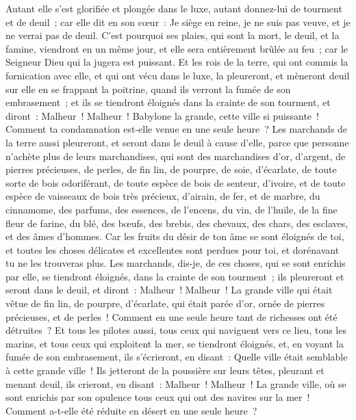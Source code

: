 \begin{multicols}{2}
Autant elle s'est glorifiée et plongée dans le luxe, autant donnez-lui de tourment et de deuil~; car elle dit en son cœur~: Je siège en reine, je ne suis pas veuve, et je ne verrai pas de deuil.
C'est pourquoi ses plaies, qui sont la mort, le deuil, et la famine, viendront en un même jour, et elle sera entièrement brûlée au feu~; car le Seigneur Dieu qui la jugera est puissant.
Et les rois de la terre, qui ont commis la fornication avec elle, et qui ont vécu dans le luxe, la pleureront, et mèneront deuil sur elle en se frappant la poitrine, quand ils verront la fumée de son embrasement~;
et ils se tiendront éloignés dans la crainte de son tourment, et diront~: Malheur~! Malheur~! Babylone la grande, cette ville si puissante~! Comment ta condamnation est-elle venue en une seule heure~?
Les marchands de la terre aussi pleureront, et seront dans le deuil à cause d'elle, parce que personne n'achète plus de leurs marchandises,
qui sont des marchandises d'or, d'argent, de pierres précieuses, de perles, de fin lin, de pourpre, de soie, d'écarlate, de toute sorte de bois odoriférant, de toute espèce de bois de senteur, d'ivoire, et de toute espèce de vaisseaux de bois très précieux, d'airain, de fer, et de marbre,
du cinnamome, des parfums, des essences, de l'encens, du vin, de l'huile, de la fine fleur de farine, du blé, des bœufs, des brebis, des chevaux, des chars, des esclaves, et des âmes d'hommes.
Car les fruits du désir de ton âme se sont éloignés de toi, et toutes les choses délicates et excellentes sont perdues pour toi, et dorénavant tu ne les trouveras plus.
Les marchands, dis-je, de ces choses, qui se sont enrichis par elle, se tiendront éloignés, dans la crainte de son tourment~; ils pleureront et seront dans le deuil,
et diront~: Malheur~! Malheur~! La grande ville qui était vêtue de fin lin, de pourpre, d'écarlate, qui était parée d'or, ornée de pierres précieuses, et de perles~! Comment en une seule heure tant de richesses ont été détruites~?
Et tous les pilotes aussi, tous ceux qui naviguent vers ce lieu, tous les marins, et tous ceux qui exploitent la mer, se tiendront éloignés,
et, en voyant la fumée de son embrasement, ils s'écrieront, en disant~: Quelle ville était semblable à cette grande ville~!
Ils jetteront de la poussière sur leurs têtes, pleurant et menant deuil, ils crieront, en disant~: Malheur~! Malheur~! La grande ville, où se sont enrichis par son opulence tous ceux qui ont des navires sur la mer~! Comment a-t-elle été réduite en désert en une seule heure~?

\end{multicols}
